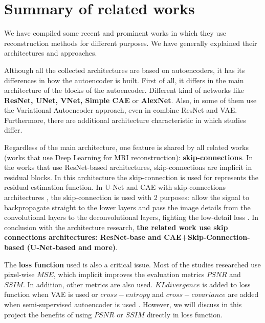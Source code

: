 \section{Summary of related works}

We have compiled some recent and prominent works in which they use reconstruction methods for different purposes. We have generally explained their architectures and approaches.

Although all the collected architectures are based on autoencoders, it has its differences in how the autoencoder is built. First of all, it differs in the main architecture of the blocks of the autoencoder. Different kind of networks like \textbf{ResNet, UNet, VNet, Simple CAE} or \textbf{AlexNet}. Also, in some of them use the Variational Autoencoder approach, even in \cite{myronenko20183d} combine ResNet and VAE. 
Furthermore, there are additional architecture characteristic in which studies differ. 

Regardless of the main architecture, one feature is shared by all related works (works that use Deep Learning for MRI reconstruction): \textbf{skip-connections}. In the works that use ResNet-based \cite{myronenko20183d} \cite{learnvolrepreCODE} architectures, skip-connections are implicit in residual blocks. In this architecture the skip-connection is used for represents the residual estimation function. In U-Net \cite{2020inpainting} and CAE with skip-connections architectures \cite{bermudez2018t1autoencoder} \cite{superresolution}, the skip-connection is used with 2 purposes: allow the signal to backpropagate straight to the lower layers and pass the image details from the convolutional layers to the deconvolutional layers, fighting the low-detail loss \cite{superresolution}. In conclusion with the architecture research, \textbf{the related work use skip connections architectures: ResNet-base and CAE+Skip-Connection-based (U-Net-based and more)}.

The \textbf{loss function} used is also a critical issue. Most of the studies researched use pixel-wise $MSE$, which implicit improves the evaluation metrics $PSNR$ and $SSIM$. In addition, other metrics are also used. $KL divergence$ is added to loss function when VAE is used or $cross-entropy$ and $cross-covariance$ are added when semi-supervised autoencoder is used \cite{pinaya2019}. However, we will discuss in this project the benefits of using $PSNR$ or $SSIM$ directly in loss function. 

